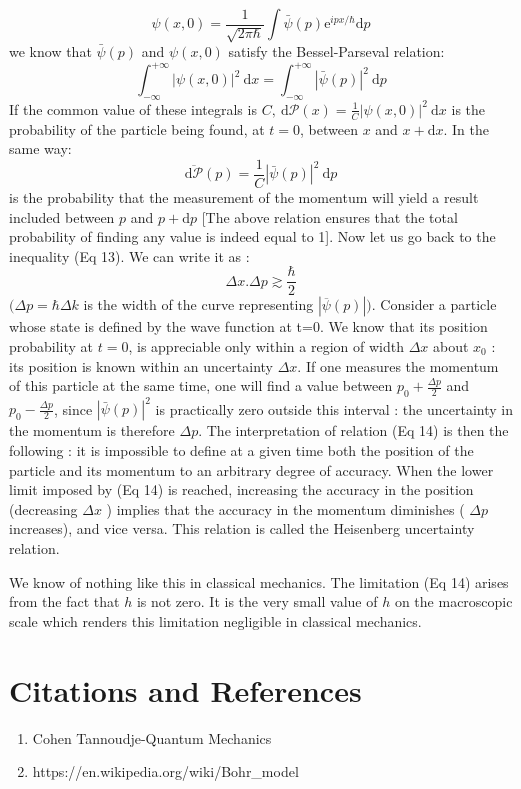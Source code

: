 \documentclass[%
 reprint,
 amsmath,amssymb,
 aps,
]{revtex4-2}
\begin{document}
$$
\psi(x, 0)=\frac{1}{\sqrt{2 \pi \hbar}} \int \bar{\psi}(p) \mathrm{e}^{i p x / \hbar} \mathrm{d} p
$$
we know that $\bar{\psi}(p)$ and $\psi(x, 0)$ satisfy the Bessel-Parseval relation:
$$
\int_{-\infty}^{+\infty}|\psi(x, 0)|^2 \mathrm{~d} x=\int_{-\infty}^{+\infty}|\bar{\psi}(p)|^2 \mathrm{~d} p
$$
If the common value of these integrals is $C, \mathrm{~d} \mathscr{P}(x)=\frac{1}{C}|\psi(x, 0)|^2 \mathrm{~d} x$ is the probability of the particle being found, at $t=0$, between $x$ and $x+\mathrm{d} x$. In the same way:
$$
\overline{\mathrm{d} \mathscr{P}}(p)=\frac{1}{C}|\bar{\psi}(p)|^2 \mathrm{~d} p
$$
is the probability that the measurement of the momentum will yield a result included between $p$ and $p+\mathrm{d} p$ [The above relation ensures that the total probability of finding any value is indeed equal to 1].
Now let us go back to the inequality (Eq 13). We can write it as :
\begin{equation}
\Delta x . \Delta p \gtrsim \frac{\hbar} {2}
\end{equation}
$(\Delta p=\hbar \Delta k$ is the width of the curve representing $|\overline{\psi}(p)|)$. Consider a particle whose state is defined by the wave function at t=0. We know that its position probability at $t=0$, is appreciable only within a region of width $\Delta x$ about $x_0$ : its position is known within an uncertainty $\Delta x$. If one measures the momentum of this particle at the same time, one will find a value between $p_0+\frac{\Delta p}{2}$ and $p_0-\frac{\Delta p}{2}$, since $|\bar{\psi}(p)|^2$ is practically zero outside this interval : the uncertainty in the momentum is therefore $\Delta p$. The interpretation of relation (Eq 14) is then the following : it is impossible to define at a given time both the position of the particle and its momentum to an arbitrary degree of accuracy. When the lower limit imposed by (Eq 14) is reached, increasing the accuracy in the position (decreasing $\Delta x$ ) implies that the accuracy in the momentum diminishes ( $\Delta p$ increases), and vice versa. This relation is called the Heisenberg uncertainty relation.

We know of nothing like this in classical mechanics. The limitation (Eq 14) arises from the fact that $h$ is not zero. It is the very small value of $h$ on the macroscopic scale which renders this limitation negligible in classical mechanics.
\section{\label{sec:citeref}Citations and References}
\begin{enumerate}
\item Cohen Tannoudje-Quantum Mechanics
\item https://en.wikipedia.org/wiki/Bohr\_model
\end{enumerate}
\end{document}
